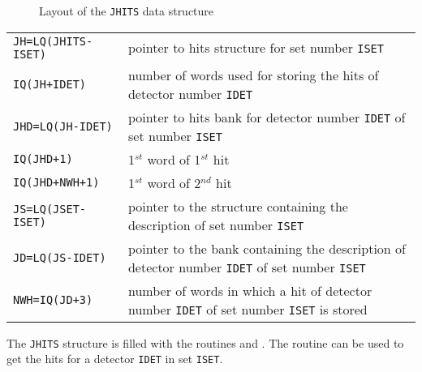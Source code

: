      
     

\begin{figure}[hbt]
     \centering
     \caption{Layout of the {\tt JHITS} data structure}
     \label{fg:hits299-1}
\end{figure}

\begin{tabular}{lp{12cm}}
\tt JH=LQ(JHITS-ISET) & pointer to hits structure for set number {\tt ISET} \\
\tt IQ(JH+IDET) & number of words used for storing the hits
of detector number {\tt IDET} \\
\tt JHD=LQ(JH-IDET) & pointer to hits bank for detector number {\tt IDET} of
set number {\tt ISET} \\
\tt IQ(JHD+1) & 1$^{st}$ word of 1$^{st}$ hit \\
\tt IQ(JHD+NWH+1) & 1$^{st}$ word of 2$^{nd}$ hit \\
\tt JS=LQ(JSET-ISET) & pointer to the structure containing the description
of set number {\tt ISET} \\
\tt JD=LQ(JS-IDET) & pointer to the bank containing the description of detector
number {\tt IDET} of set number {\tt ISET} \\
\tt NWH=IQ(JD+3) & number of words in which a hit of detector
number {\tt IDET} of set number {\tt ISET} is stored
\end{tabular}

The {\tt JHITS} structure is filled with the routines  and
.
The routine  can be used to get the hits for a detector
{\tt IDET} in set {\tt ISET}.
